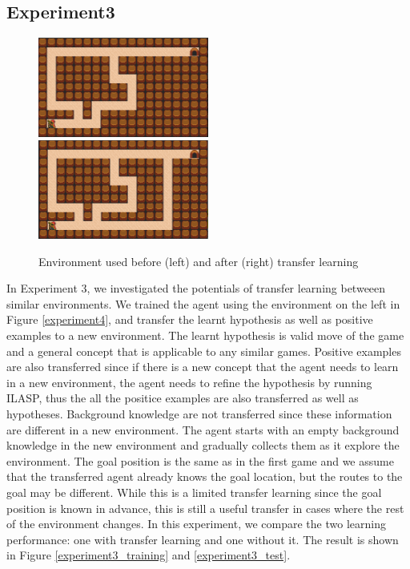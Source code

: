 \newpage

\subsection{Experiment3}

\begin{figure}[!htb]
\centerline{
\includegraphics[width=0.5\textwidth]{./figures/experiment4_before}
\includegraphics[width=0.5\textwidth]{./figures/experiment4_after}
}
\caption{Environment used before (left) and after (right) transfer learning}
\label{experiment3}
\end{figure}

In Experiment 3, we investigated the potentials of transfer learning betweeen similar environments.
We trained the agent using the environment on the left in Figure \ref{experiment4}, and transfer the learnt hypothesis as well as positive examples to a new environment.
The learnt hypothesis is valid move of the game and a general concept that is applicable to any similar games. Positive examples are also transferred since
if there is a new concept that the agent needs to learn in a new environment, the agent needs to refine the hypothesis by running ILASP, thus the all the positice examples
are also transferred as well as hypotheses. Background knowledge are not transferred since these information are different in a new environment.
The agent starts with an empty background knowledge in the new environment and gradually collects them
as it explore the environment. The goal position is the same as in the first game and we assume that the transferred agent already knows the goal location, but the routes to the goal may be different.
While this is a limited transfer learning since the goal position is known in advance, this is still a useful transfer in cases where the rest of the environment changes.
In this experiment, we compare the two learning performance: one with transfer learning and one without it.
The result is shown in Figure \ref{experiment3_training} and \ref{experiment3_test}.

